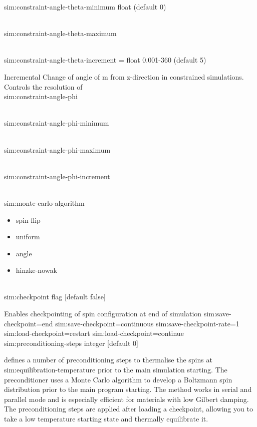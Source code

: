 {\zicf  sim:constraint-angle-theta-minimum float (default 0)}\\

{\zicf  sim:constraint-angle-theta-maximum}\\

{\zicf  sim:constraint-angle-theta-increment = float 0.001-360 (default 5)}
    Incremental Change of angle of m from z-direction in constrained simulations. Controls the resolution of \\

{\zicf sim:constraint-angle-phi}\\

{\zicf sim:constraint-angle-phi-minimum}\\

{\zicf sim:constraint-angle-phi-maximum}\\

{\zicf sim:constraint-angle-phi-increment}\\

{\zicf sim:monte-carlo-algorithm}
\begin{itemize}
  \item[] spin-flip
  \item[] uniform
  \item[] angle
  \item[] hinzke-nowak
\end{itemize}\\

{\zicf sim:checkpoint flag [default false]}
    Enables checkpointing of spin configuration at end of simulation
sim:save-checkpoint=end
sim:save-checkpoint=continuous
sim:save-checkpoint-rate=1
sim:load-checkpoint=restart
sim:load-checkpoint=continue\\

{\zicf sim:preconditioning-steps
    integer [default 0]}
    defines a number of preconditioning steps to thermalise the spins at
    sim:equilibration-temperature prior to the main simulation starting. The
    preconditioner uses a Monte Carlo algorithm to develop a Boltzmann spin
    distribution prior to the main program starting. The method works in serial
    and parallel mode and is especially efficient for materials with low Gilbert
    damping. The preconditioning steps are applied after loading a checkpoint,
    allowing you to take a low temperature starting state and thermally
    equilibrate it.\\

